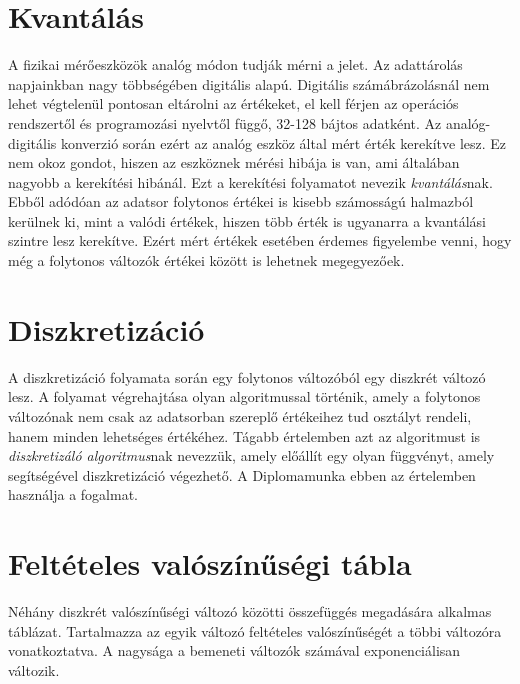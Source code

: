 \section{Kvantálás}
A fizikai mérőeszközök analóg módon tudják mérni a jelet. Az adattárolás napjainkban nagy többségében digitális alapú. Digitális számábrázolásnál nem lehet végtelenül pontosan eltárolni az értékeket, el kell férjen az operációs rendszertől és programozási nyelvtől függő, 32-128 bájtos adatként. Az analóg-digitális konverzió során ezért az analóg eszköz által mért érték kerekítve lesz. Ez nem okoz gondot, hiszen az eszköznek mérési hibája is van, ami általában nagyobb a kerekítési hibánál. Ezt a kerekítési folyamatot nevezik \emph{kvantálás}nak. Ebből adódóan az adatsor folytonos értékei is kisebb számosságú halmazból kerülnek ki, mint a valódi értékek, hiszen több érték is ugyanarra a kvantálási szintre lesz kerekítve. Ezért mért értékek esetében érdemes figyelembe venni, hogy még a folytonos változók értékei között is lehetnek megegyezőek.

\section{Diszkretizáció}
A diszkretizáció folyamata során egy folytonos változóból egy diszkrét változó lesz. A folyamat végrehajtása olyan algoritmussal történik, amely a folytonos változónak nem csak az adatsorban szereplő értékeihez tud osztályt rendeli, hanem minden lehetséges értékéhez. Tágabb értelemben azt az algoritmust is \emph{diszkretizáló algoritmus}nak nevezzük, amely előállít egy olyan függvényt, amely segítségével diszkretizáció végezhető. A Diplomamunka ebben az értelemben használja a fogalmat.

\section{Feltételes valószínűségi tábla}
Néhány diszkrét valószínűségi változó közötti összefüggés megadására alkalmas táblázat. Tartalmazza az egyik változó feltételes valószínűségét a többi változóra vonatkoztatva. A nagysága a bemeneti változók számával exponenciálisan változik.

